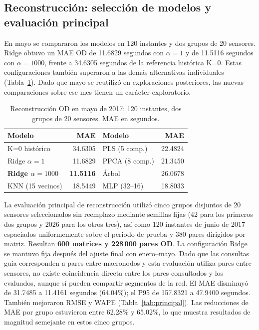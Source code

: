 \documentclass[letterpaper,11pt]{article}
\begin{document}
\subsection{Reconstrucción: selección de modelos y evaluación principal}
En mayo se compararon los modelos en 120 instantes y dos grupos de 20 sensores. Ridge obtuvo un MAE OD de 11.6829 segundos con $\alpha=1$ y de 11.5116 segundos con $\alpha=1000$, frente a 34.6305 segundos de la referencia histórica K=0. Estas configuraciones también superaron a las demás alternativas individuales (Tabla~\ref{tab:candidatos}). Dado que mayo se reutilizó en exploraciones posteriores, las nuevas comparaciones sobre ese mes tienen un carácter exploratorio.

\begin{table}[htbp]\centering\small
\caption{Reconstrucción OD en mayo de 2017: 120 instantes, dos grupos de 20 sensores. MAE en segundos.}\label{tab:candidatos}
\begin{tabular}{@{}lrlr@{}}\toprule
Modelo & MAE & Modelo & MAE \\ \midrule
K=0 histórico & 34.6305 & PLS (5 comp.) & 22.4824 \\
Ridge $\alpha=1$ & 11.6829 & PPCA (8 comp.) & 21.3450 \\
\textbf{Ridge $\alpha=1000$} & \textbf{11.5116} & Árbol & 26.0678 \\
KNN (15 vecinos) & 18.5449 & MLP (32--16) & 18.8033 \\ \bottomrule
\end{tabular}
\end{table}

La evaluación principal de reconstrucción utilizó cinco grupos disjuntos de 20 sensores seleccionados sin reemplazo mediante semillas fijas (42 para los primeros dos grupos y 2026 para los otros tres), así como 120 instantes de junio de 2017 espaciados uniformemente sobre el periodo de prueba y 380 pares dirigidos por matriz. Resultan \textbf{600 matrices y 228\,000 pares OD}. La configuración Ridge se mantuvo fija después del ajuste final con enero--mayo. Dado que las consultas guía corresponden a pares entre macronodos y esta evaluación utiliza pares entre sensores, no existe coincidencia directa entre los pares consultados y los evaluados, aunque sí pueden compartir segmentos de la red. El MAE disminuyó de 31.7485 a 11.4161 segundos (64.04\%); el P95 de 157.8321 a 47.9400 segundos. También mejoraron RMSE y WAPE (Tabla~\ref{tab:principal}). Las reducciones de MAE por grupo estuvieron entre 62.28\% y 65.02\%, lo que muestra resultados de magnitud semejante en estos cinco grupos.
\end{document}

